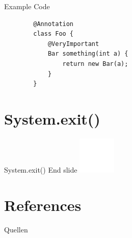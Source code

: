 \documentclass[final, ngerman, xcolor=pdftex, dvipsnames, table, aspectratio=169, 14pt]{beamer}
\begin{document}
\begin{frame}[fragile]{Example Code}
    \large\begin{verbatim}
        @Annotation
        class Foo {
            @VeryImportant
            Bar something(int a) {
                return new Bar(a);
            }
        }
    \end{verbatim}
\end{frame}

\section*{System.exit()}

\begin{frame}{System.exit()}
  \Large End slide  
  \includegraphics{pictures/GitHub-Mark.pdf}
\end{frame}

\section*{References}
\begin{frame}[allowframebreaks]{Quellen}
  \nocite{web.daggerdoc}
  \nocite{web.postDagger2}
  \small
  
  
\end{frame}
\end{document}
